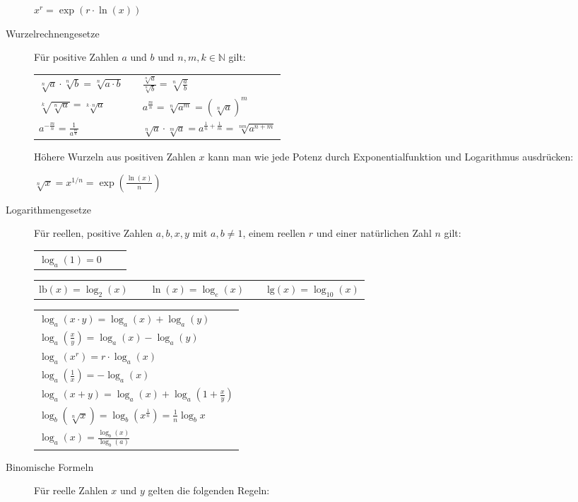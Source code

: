 \documentclass[
  ngerman,
  a4paper,
  landscape, fontsize=9pt, version=first, enabledeprecatedfontcommands,
  DIV=6]{scrartcl}
\begin{document}
\begin{multicols}{3}
\begin{description}
\(\displaystyle x^{r} = \exp\left(r \cdot \ln(x)\right)\)
\item[Wurzelrechnengesetze]
Für positive Zahlen \(a\) und \(b\) und \(n,m,k \in \mathbb{N}\) gilt:

\begin{tabular}{ l c l }
$\displaystyle \sqrt[n]{a}\cdot\sqrt[n]{b}=\sqrt[n]{a\cdot b}$ & & 
$\displaystyle \frac{\sqrt[n]{a}}{\sqrt[n]{b}}=\sqrt[n]{\frac{a}{b}}$ \\
$\displaystyle \sqrt[k]{\sqrt[n]{a}}=\sqrt[k\cdot n]{a}$ & & 
$\displaystyle a^{\frac{m}{n}}=\sqrt[n]{a^m}=\left(\sqrt[n]{a} \right)^m$ \\
$\displaystyle a^{-\frac{m}{n}}=\frac{1}{a^\frac{m}{n}}$ & &
$\displaystyle \sqrt[n]{a}\cdot\sqrt[m]{a}=a^{\frac{1}{n}+\frac{1}{m}}=\sqrt[nm]{a^{n+m}}$ \\
\end{tabular}

Höhere Wurzeln aus positiven Zahlen \(x\) kann man wie jede Potenz durch
Exponentialfunktion und Logarithmus ausdrücken:

\(\displaystyle \sqrt[n]{x} = x^{1/n} = \exp\left(\frac{\ln(x)}{n}\right)\)
\item[Logarithmengesetze]
Für reellen, positive Zahlen \(a,b, x, y\) mit \(a, b \neq 1\), einem
reellen \(r\) und einer natürlichen Zahl \(n\) gilt:

\begin{tabular}{ l c l }
    $\displaystyle \log_a(1) = 0$ & & \\
\end{tabular}

\begin{tabular}{ l c l c l}
    $\displaystyle \text{lb}(x) = \log_2(x)$ & $\,$ & $\displaystyle \ln(x) = \log_e(x)$ & $\;$ & $\displaystyle \text{lg}(x) = \log_{10}(x)$ \\
\end{tabular}

\begin{tabular}{ l }
    $\displaystyle \log_a (x \cdot y) = \log_a(x) + \log_a(y)$ \\
    $\displaystyle \log_a \left(\frac{x}{y}\right) = \log_a(x) - \log_a(y)$ \\
    $\displaystyle \log_a(x^r) = r \cdot \log_a(x)$ \\
    $\displaystyle \log_a\left(\frac{1}{x}\right) = - \log_a(x)$ \\
    $\displaystyle \log_a(x + y) = \log_a(x) + \log_a\left(1+ \frac{x}{y}\right)$ \\
    $\displaystyle \log_b\left(\sqrt[n]{x}\right) = \log_b \left(x^{\frac 1n}\right) = \frac 1n\log_b x$ \\
    $\displaystyle \log_a(x) = \frac{\log_b(x)}{\log_b(a)}$
\end{tabular}
\item[Binomische Formeln]
Für reelle Zahlen \(x\) und \(y\) gelten die folgenden Regeln:


\end{description}
\end{multicols}
\end{document}
